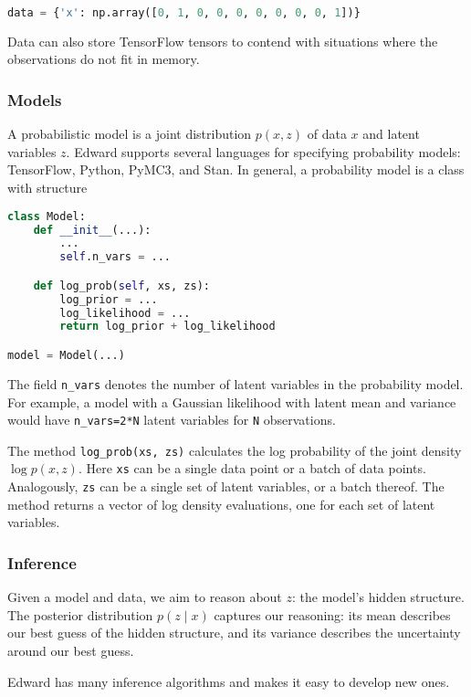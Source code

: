 \begin{lstlisting}[language=Python]
data = {'x': np.array([0, 1, 0, 0, 0, 0, 0, 0, 0, 1])}
\end{lstlisting}

Data can also store TensorFlow tensors to contend with situations where the
observations do not fit in memory.

\subsubsection{Models}\label{models}

A probabilistic model is a joint distribution $p(x, z)$ of data $x$ and latent
variables $z$.
Edward supports several languages for specifying probability models:
TensorFlow, Python, PyMC3, and Stan. In general, a probability
model is a class with structure
\begin{lstlisting}[language=Python]
class Model:
    def __init__(...):
        ...
        self.n_vars = ...

    def log_prob(self, xs, zs):
        log_prior = ...
        log_likelihood = ...
        return log_prior + log_likelihood

model = Model(...)
\end{lstlisting}
The field \texttt{n\_vars} denotes the number of latent variables in the
probability model. For example, a model with a Gaussian likelihood with latent
mean and variance would have \texttt{n\_vars=2*N} latent variables for
\texttt{N} observations.

The method \texttt{log_prob(xs, zs)} calculates the log probability of
the joint density $\log p(x,z)$. Here \texttt{xs} can be a single data
point or a batch of data points. Analogously, \texttt{zs} can be a
single set of latent variables, or a batch thereof. The method returns a vector
of log density evaluations, one for each set of latent variables.

\subsubsection{Inference}\label{inference}

Given a model and data, we aim to
reason about $z$: the model's hidden structure. The
posterior distribution $p(z \mid x)$ captures our reasoning: its mean
describes our best guess of the hidden structure, and its variance
describes the uncertainty around our best guess.

Edward has many inference algorithms and makes it easy
to develop new ones.

